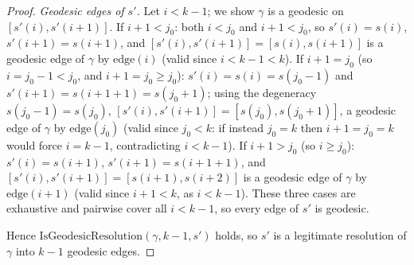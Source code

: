\begin{proof}
  \emph{Geodesic edges of $s'$.} Let $i<k-1$; we show $\gamma$ is a geodesic on
  $[s'(i),s'(i+1)]$. If $i+1<j_0$: both $i<j_0$ and $i+1<j_0$, so $s'(i)=s(i)$, $s'(i+1)=s(i+1)$,
  and $[s'(i),s'(i+1)]=[s(i),s(i+1)]$ is a geodesic edge of $\gamma$ by $\mathrm{edge}(i)$ (valid
  since $i<k-1<k$). If $i+1=j_0$ (so $i=j_0-1<j_0$, and $i+1=j_0\ge j_0$): $s'(i)=s(i)=s(j_0-1)$
  and $s'(i+1)=s(i+1+1)=s(j_0+1)$; using the degeneracy $s(j_0-1)=s(j_0)$,
  $[s'(i),s'(i+1)]=[s(j_0),s(j_0+1)]$, a geodesic edge of $\gamma$ by $\mathrm{edge}(j_0)$ (valid
  since $j_0<k$: if instead $j_0=k$ then $i+1=j_0=k$ would force $i=k-1$, contradicting $i<k-1$).
  If $i+1>j_0$ (so $i \ge j_0$): $s'(i)=s(i+1)$, $s'(i+1)=s(i+1+1)$, and
  $[s'(i),s'(i+1)]=[s(i+1),s(i+2)]$ is a geodesic edge of $\gamma$ by $\mathrm{edge}(i+1)$ (valid
  since $i+1<k$, as $i<k-1$). These three cases are exhaustive and pairwise cover all $i<k-1$, so
  every edge of $s'$ is geodesic.

  Hence $\mathrm{IsGeodesicResolution}(\gamma,k-1,s')$ holds, so $s'$ is a legitimate resolution
  of $\gamma$ into $k-1$ geodesic edges.


\end{proof}
